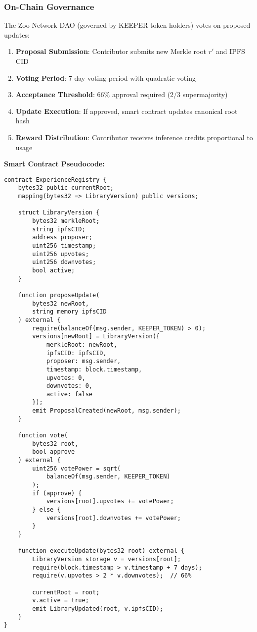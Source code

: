 \documentclass[11pt,a4paper]{article}
\begin{document}
\subsubsection{On-Chain Governance}

The Zoo Network DAO (governed by KEEPER token holders) votes on proposed updates:

\begin{enumerate}
    \item \textbf{Proposal Submission}: Contributor submits new Merkle root $r'$ and IPFS CID
    \item \textbf{Voting Period}: 7-day voting period with quadratic voting
    \item \textbf{Acceptance Threshold}: 66\% approval required (2/3 supermajority)
    \item \textbf{Update Execution}: If approved, smart contract updates canonical root hash
    \item \textbf{Reward Distribution}: Contributor receives inference credits proportional to usage
\end{enumerate}

\textbf{Smart Contract Pseudocode:}
\begin{verbatim}
contract ExperienceRegistry {
    bytes32 public currentRoot;
    mapping(bytes32 => LibraryVersion) public versions;

    struct LibraryVersion {
        bytes32 merkleRoot;
        string ipfsCID;
        address proposer;
        uint256 timestamp;
        uint256 upvotes;
        uint256 downvotes;
        bool active;
    }

    function proposeUpdate(
        bytes32 newRoot,
        string memory ipfsCID
    ) external {
        require(balanceOf(msg.sender, KEEPER_TOKEN) > 0);
        versions[newRoot] = LibraryVersion({
            merkleRoot: newRoot,
            ipfsCID: ipfsCID,
            proposer: msg.sender,
            timestamp: block.timestamp,
            upvotes: 0,
            downvotes: 0,
            active: false
        });
        emit ProposalCreated(newRoot, msg.sender);
    }

    function vote(
        bytes32 root,
        bool approve
    ) external {
        uint256 votePower = sqrt(
            balanceOf(msg.sender, KEEPER_TOKEN)
        );
        if (approve) {
            versions[root].upvotes += votePower;
        } else {
            versions[root].downvotes += votePower;
        }
    }

    function executeUpdate(bytes32 root) external {
        LibraryVersion storage v = versions[root];
        require(block.timestamp > v.timestamp + 7 days);
        require(v.upvotes > 2 * v.downvotes);  // 66%

        currentRoot = root;
        v.active = true;
        emit LibraryUpdated(root, v.ipfsCID);
    }
}
\end{verbatim}
\end{document}
